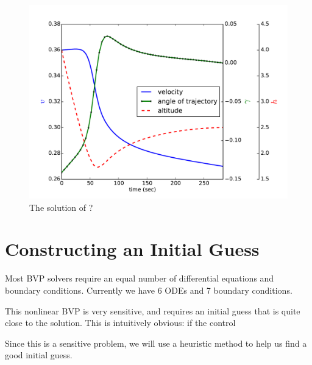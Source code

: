 \begin{figure}
\centering
\includegraphics[width=\textwidth]{solutions.pdf}
\caption{The solution of ?%
}
\label{fig:reentry:solutions}
\end{figure}



\section*{Constructing an Initial Guess}
Most BVP solvers require an equal number of differential equations and boundary conditions. 
Currently we have 6 ODEs and 7 boundary conditions. 

This nonlinear BVP is very sensitive, and requires an initial guess that is quite close to the solution.  This is intuitively obvious: if the control 


Since this is a sensitive problem, we will use a heuristic method to help us find a good initial guess.



